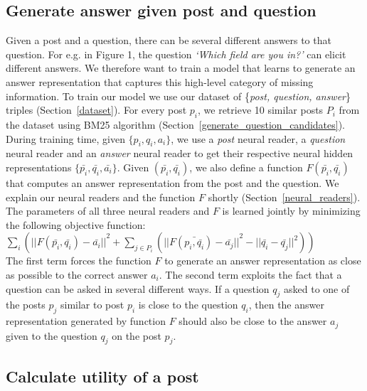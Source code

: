 \documentclass[11pt]{article}
\begin{document}
\subsection{Generate answer given post and question}

Given a post and a question, there can be several different answers to that question. For e.g. in Figure 1, the question \textit{`Which field are you in?'} can elicit different answers. We therefore want to train a model that learns to generate an answer representation that captures this high-level category of missing information. To train our model we use our dataset of \{\textit{post, question, answer}\} triples (Section~\ref{dataset}). For every post $p_i$, we retrieve 10 similar posts $P_i$ from the dataset using BM25 algorithm (Section~\ref{generate_question_candidates}). During training time, given $\{p_i, q_i, a_i\}$, we use a \textit{post} neural reader, a \textit{question} neural reader and an \textit{answer} neural reader to get their respective neural hidden representations $\{\bar{p_i}, \bar{q_i}, \bar{a_i}\}$.  Given $(\bar{p_i}, \bar{q_i})$, we also define a function $F(\bar{p_i}, \bar{q_i})$ that computes an answer representation from the post and the question. We explain our neural readers and the function $F$ shortly (Section~\ref{neural_readers}). The parameters of all three neural readers and $F$ is learned jointly by minimizing the following objective function:\\

$\sum_i ( {|| F(\bar{p_i}, \bar{q_i}) - \bar{a_i}||}^2 +
 \sum_{j \in P_i} ( {|| F(\bar{p_i, \bar{q_i}}) - \bar{a_j} ||}^2  - {|| \bar{q_i} - \bar{q_j} ||}^2))$\\

The first term forces the function $F$ to generate an answer representation as close as possible to the correct answer $a_i$. The second term exploits the fact that a question can be asked in several different ways. If a question $q_j$ asked to one of the posts $p_j$ similar to post $p_i$ is close to the question $q_i$, then the answer representation generated by function $F$ should also be close to the answer $a_j$ given to the question $q_j$ on the post $p_j$.

\subsection{Calculate utility of a post}
\end{document}

